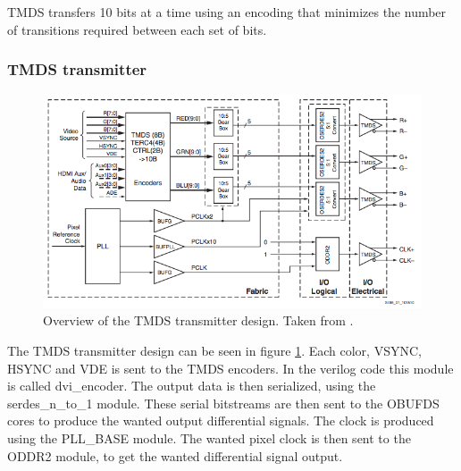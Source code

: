 TMDS transfers 10 bits at a time using an encoding that minimizes the number of transitions required between each set of bits.

\subsubsection{TMDS transmitter}
\begin{figure}[h!]
    \centering
    \includegraphics[width=\linewidth]{img/TMDStransmitterdesign.png}
    \caption{Overview of the TMDS transmitter design. Taken from \cite{xapp495}.}
    \label{fig:TMDSTransmitter}
\end{figure}
The TMDS transmitter design can be seen in figure \ref{fig:TMDSTransmitter}.
Each color, VSYNC, HSYNC and VDE is sent to the TMDS encoders.
In the verilog code this module is called dvi\_encoder.
The output data is then serialized, using the serdes\_n\_to\_1 module.
These serial bitstreams are then sent to the OBUFDS cores to produce the wanted output differential signals.
The clock is produced using the PLL\_BASE module.
The wanted pixel clock is then sent to the ODDR2 module, to get the wanted differential signal output.

